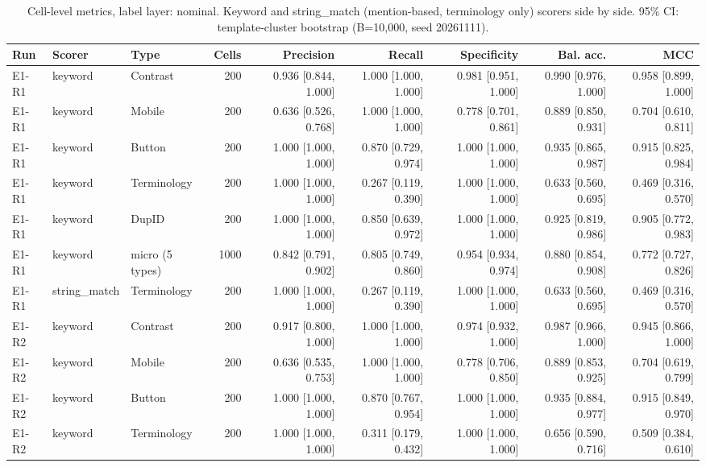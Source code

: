 \begin{table}[t]
\centering
\small
\caption{Cell-level metrics, label layer: nominal. Keyword and string\_match (mention-based, terminology only) scorers side by side. 95\% CI: template-cluster bootstrap (B=10,000, seed 20261111).}
\label{tab:e7-cells-nominal}
\begin{tabular}{lllrrrrrr}
\toprule
Run & Scorer & Type & Cells & Precision & Recall & Specificity & Bal. acc. & MCC \\
\midrule
E1-R1 & keyword & Contrast & 200 & 0.936 [0.844, 1.000] & 1.000 [1.000, 1.000] & 0.981 [0.951, 1.000] & 0.990 [0.976, 1.000] & 0.958 [0.899, 1.000] \\
E1-R1 & keyword & Mobile & 200 & 0.636 [0.526, 0.768] & 1.000 [1.000, 1.000] & 0.778 [0.701, 0.861] & 0.889 [0.850, 0.931] & 0.704 [0.610, 0.811] \\
E1-R1 & keyword & Button & 200 & 1.000 [1.000, 1.000] & 0.870 [0.729, 0.974] & 1.000 [1.000, 1.000] & 0.935 [0.865, 0.987] & 0.915 [0.825, 0.984] \\
E1-R1 & keyword & Terminology & 200 & 1.000 [1.000, 1.000] & 0.267 [0.119, 0.390] & 1.000 [1.000, 1.000] & 0.633 [0.560, 0.695] & 0.469 [0.316, 0.570] \\
E1-R1 & keyword & DupID & 200 & 1.000 [1.000, 1.000] & 0.850 [0.639, 0.972] & 1.000 [1.000, 1.000] & 0.925 [0.819, 0.986] & 0.905 [0.772, 0.983] \\
E1-R1 & keyword & micro (5 types) & 1000 & 0.842 [0.791, 0.902] & 0.805 [0.749, 0.860] & 0.954 [0.934, 0.974] & 0.880 [0.854, 0.908] & 0.772 [0.727, 0.826] \\
E1-R1 & string\_match & Terminology & 200 & 1.000 [1.000, 1.000] & 0.267 [0.119, 0.390] & 1.000 [1.000, 1.000] & 0.633 [0.560, 0.695] & 0.469 [0.316, 0.570] \\
E1-R2 & keyword & Contrast & 200 & 0.917 [0.800, 1.000] & 1.000 [1.000, 1.000] & 0.974 [0.932, 1.000] & 0.987 [0.966, 1.000] & 0.945 [0.866, 1.000] \\
E1-R2 & keyword & Mobile & 200 & 0.636 [0.535, 0.753] & 1.000 [1.000, 1.000] & 0.778 [0.706, 0.850] & 0.889 [0.853, 0.925] & 0.704 [0.619, 0.799] \\
E1-R2 & keyword & Button & 200 & 1.000 [1.000, 1.000] & 0.870 [0.767, 0.954] & 1.000 [1.000, 1.000] & 0.935 [0.884, 0.977] & 0.915 [0.849, 0.970] \\
E1-R2 & keyword & Terminology & 200 & 1.000 [1.000, 1.000] & 0.311 [0.179, 0.432] & 1.000 [1.000, 1.000] & 0.656 [0.590, 0.716] & 0.509 [0.384, 0.610] \\

\end{tabular}
\end{table}
